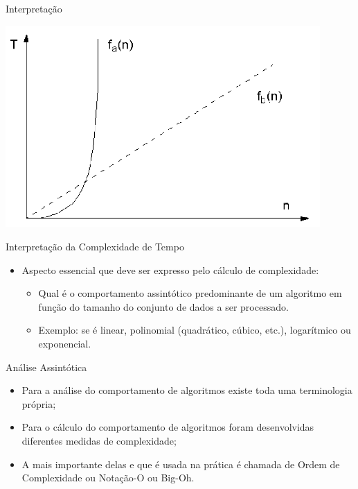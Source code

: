 \documentclass[12pt,table,xcolor={dvipsnames}]{beamer}
\begin{document}
\begin{frame}[fragile]{Interpretação}
\begin{center}
\includegraphics[width=0.9\textwidth]{function.png} 
\end{center}          
\end{frame}

\begin{frame}[fragile]{Interpretação da Complexidade de Tempo}
\begin{itemize}
\item Aspecto essencial que deve ser expresso pelo cálculo de complexidade:
\begin{itemize}
\item Qual é o comportamento assintótico predominante de um algoritmo em função do tamanho do conjunto de dados a ser processado.
\item Exemplo: se é linear, polinomial (quadrático, cúbico, etc.), logarítmico ou exponencial.
\end{itemize}
\end{itemize}
\end{frame}

\begin{frame}[fragile]{Análise Assintótica}
\begin{itemize}
\item Para a análise do comportamento de algoritmos existe toda uma terminologia própria;
\item Para o cálculo do comportamento de algoritmos foram desenvolvidas diferentes medidas de complexidade;
\item A mais importante delas e que é usada na prática é chamada de Ordem de Complexidade ou Notação-O ou Big-Oh.
\end{itemize}
\end{frame}
\end{document}
